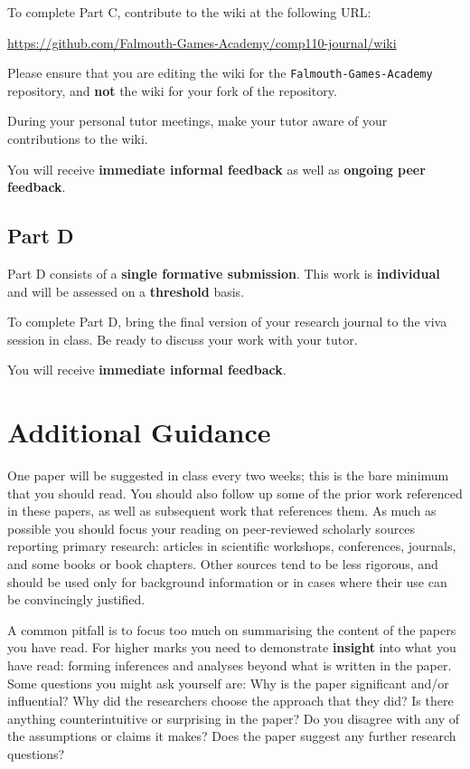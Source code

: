 \documentclass{../fal_assignment}
\begin{document}
To complete Part C, contribute to the wiki at the following URL:

\url{https://github.com/Falmouth-Games-Academy/comp110-journal/wiki}

Please ensure that you are editing the wiki for the \texttt{Falmouth-Games-Academy} repository,
and \textbf{not} the wiki for your fork of the repository.

During your personal tutor meetings, make your tutor aware of your contributions to the wiki.

You will receive \textbf{immediate informal feedback} as well as \textbf{ongoing peer feedback}.

\subsection*{Part D}

Part D consists of a \textbf{single formative submission}. This work is \textbf{individual} and will be assessed on a \textbf{threshold} basis.

To complete Part D, bring the final version of your research journal to the viva session in class.
Be ready to discuss your work with your tutor.

You will receive \textbf{immediate informal feedback}.

\section*{Additional Guidance}

One paper will be suggested in class every two weeks; this is the bare minimum that you should read.
You should also follow up some of the prior work referenced in these papers,
as well as subsequent work that references them.
As much as possible you should focus your reading on peer-reviewed scholarly sources reporting primary research:
articles in scientific workshops, conferences, journals, and some books or book chapters.
Other sources tend to be less rigorous, and should be used only for background information
or in cases where their use can be convincingly justified.

A common pitfall is to focus too much on summarising the content of the papers you have read.
For higher marks you need to demonstrate \textbf{insight} into what you have read:
forming inferences and analyses beyond what is written in the paper.
Some questions you might ask yourself are:
Why is the paper significant and/or influential?
Why did the researchers choose the approach that they did?
Is there anything counterintuitive or surprising in the paper?
Do you disagree with any of the assumptions or claims it makes?
Does the paper suggest any further research questions?
\end{document}
